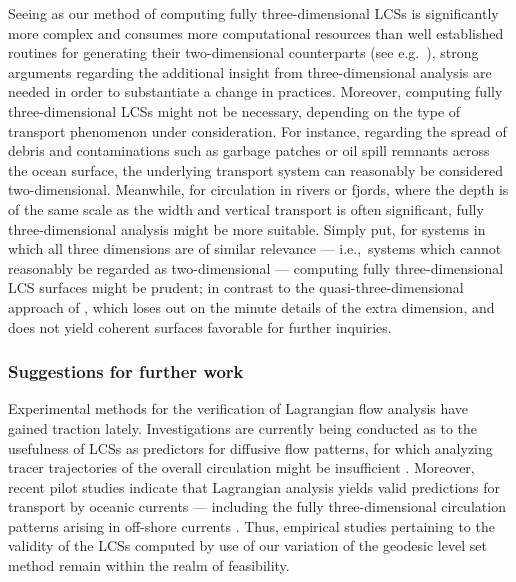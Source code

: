 Seeing as our method of computing fully three-dimensional LCSs is significantly
more complex and consumes more computational resources than well established
routines for generating their two-dimensional counterparts (see e.g.\
\textcite{onu2015lcstool}), strong arguments regarding the additional insight
from three-dimensional analysis are needed in order to substantiate a change in
practices. Moreover, computing fully three-dimensional LCSs might not be
necessary, depending on the type of transport phenomenon under consideration.
For instance, regarding the spread of debris and contaminations such as garbage
patches or oil spill remnants across the ocean surface, the underlying
transport system can reasonably be considered two-dimensional. Meanwhile, for
circulation in rivers or fjords, where the depth is of the same scale as the
width and vertical transport is often significant, fully three-dimensional
analysis might be more suitable. Simply put, for systems in which all three
dimensions are of similar relevance --- i.e.,\ systems which cannot reasonably
be regarded as two-dimensional --- computing fully three-dimensional LCS
surfaces might be prudent; in contrast to the quasi-three-dimensional approach
of \textcite{blazevski2014hyperbolic}, which loses out on the minute details
of the extra dimension, and does not yield coherent surfaces favorable for
further inquiries.

\subsubsection{Suggestions for further work}
\label{ssub:suggestions_for_further_work}
Experimental methods for the verification of Lagrangian flow analysis have
gained traction lately. Investigations are currently being conducted as to the
usefulness of LCSs as predictors for diffusive flow patterns, for which
analyzing tracer trajectories of the overall circulation might be insufficient
\parencite{haller2018material}. Moreover, recent pilot studies indicate that
Lagrangian analysis yields valid predictions for transport by oceanic currents
\parencite{filippi2018detection} --- including the fully three-dimensional
circulation patterns arising in off-shore currents
\parencite{peacock2018targeted}. Thus, empirical studies pertaining to the
validity of the LCSs computed by use of our variation of the geodesic level set
method remain within the realm of feasibility.

